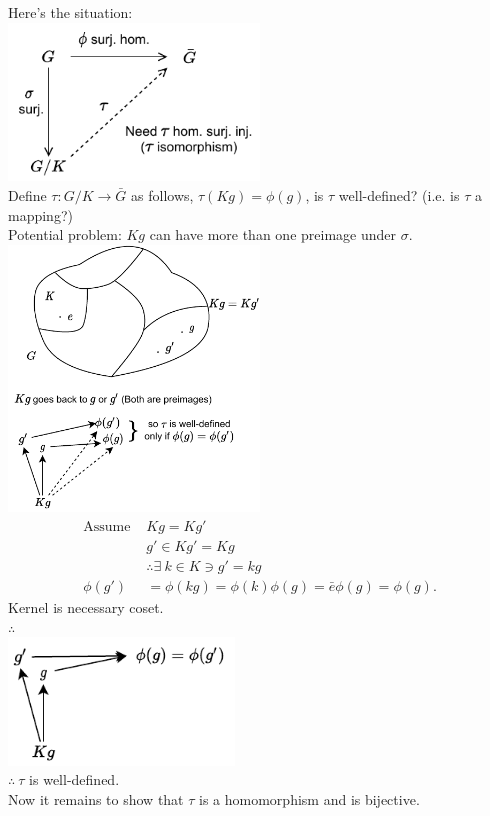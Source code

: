 \begin{theorem}
\noindent Here's the situation: \\
\includegraphics[width=0.5\textwidth]{Figures/1stiso_diag1.pdf} \\
Define $\tau: G/K \rightarrow \bar{G}$ as follows, $\tau(Kg)=\phi(g)$, is $\tau$ well-defined? (i.e. is $\tau$ a mapping?)\steezybreak\\
Potential problem: $Kg$ can have more than one preimage under $\sigma$.\\
\includegraphics[width=0.5\textwidth]{Figures/1stIso_diag2.pdf}\\
\begin{align}
    \text{Assume }&Kg=Kg' \nonumber \\
    &g'\in Kg'=Kg \nonumber \\
    &\therefore \exists \ k\in K \ni g'=kg \nonumber \\
    \phi(g')&=\phi(kg)=\phi(k)\phi(g)=\bar{e}\phi(g)=\phi(g). \nonumber
\end{align}
Kernel is necessary coset. \\
$\therefore$\\
\includegraphics[width=0.45\textwidth]{Figures/1stIso_diag3.pdf} \\
$\therefore \ \tau$ is well-defined. \\
Now it remains to show that $\tau$ is a homomorphism and is bijective. 
 

\end{theorem}
